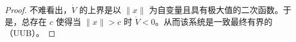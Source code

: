 \begin{proof}
    不难看出，$\dot{V}$ 的上界是以 $\| x \|$ 为自变量且具有极大值的二次函数。于是，总存在 $c$ 使得当 $\| x \| > c$ 时 $\dot{V} < 0$。从而该系统是一致最终有界的（UUB）。
\end{proof}




